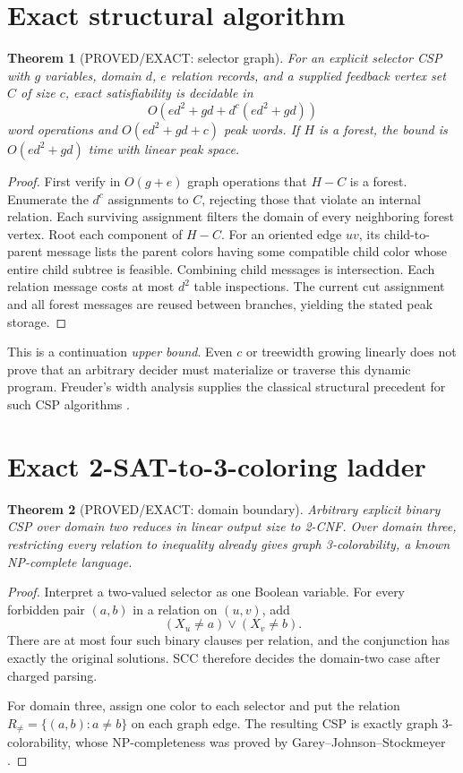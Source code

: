 \documentclass[11pt]{article}
\newtheorem{theorem}{Theorem}
\begin{document}
\section{Exact structural algorithm}
\begin{theorem}[PROVED/EXACT: selector graph]
For an explicit selector CSP with $g$ variables, domain $d$, $e$ relation
records, and a supplied feedback vertex set $C$ of size $c$, exact
satisfiability is decidable in
\[
O\!\left(ed^2+gd+d^c(ed^2+gd)\right)
\]
word operations and $O(ed^2+gd+c)$ peak words. If $H$ is a forest, the bound
is $O(ed^2+gd)$ time with linear peak space.
\end{theorem}
\begin{proof}
First verify in $O(g+e)$ graph operations that $H-C$ is a forest. Enumerate
the $d^c$ assignments to $C$, rejecting those that violate an internal
relation. Each surviving assignment filters the domain of every neighboring
forest vertex. Root each component of $H-C$. For an oriented edge $uv$, its
child-to-parent message lists the parent colors having some compatible child
color whose entire child subtree is feasible. Combining child messages is
intersection. Each relation message costs at most $d^2$ table inspections.
The current cut assignment and all forest messages are reused between
branches, yielding the stated peak storage.
\end{proof}

This is a continuation \emph{upper bound}. Even $c$ or treewidth growing
linearly does not prove that an arbitrary decider must materialize or traverse
this dynamic program. Freuder's width analysis supplies the classical
structural precedent for such CSP algorithms \cite{freuder82,freuder90}.

\section{Exact 2-SAT-to-3-coloring ladder}
\begin{theorem}[PROVED/EXACT: domain boundary]
Arbitrary explicit binary CSP over domain two reduces in linear output size
to 2-CNF. Over domain three, restricting every relation to inequality already
gives graph 3-colorability, a known NP-complete language.
\end{theorem}
\begin{proof}
Interpret a two-valued selector as one Boolean variable. For every forbidden
pair $(a,b)$ in a relation on $(u,v)$, add
\[
(X_u\ne a)\vee(X_v\ne b).
\]
There are at most four such binary clauses per relation, and the conjunction
has exactly the original solutions. SCC therefore decides the domain-two
case after charged parsing.

For domain three, assign one color to each selector and put the relation
$R_{\ne}=\{(a,b):a\ne b\}$ on each graph edge. The resulting CSP is exactly
graph 3-colorability, whose NP-completeness was proved by
Garey--Johnson--Stockmeyer \cite{gjs}.
\end{proof}
\end{document}
